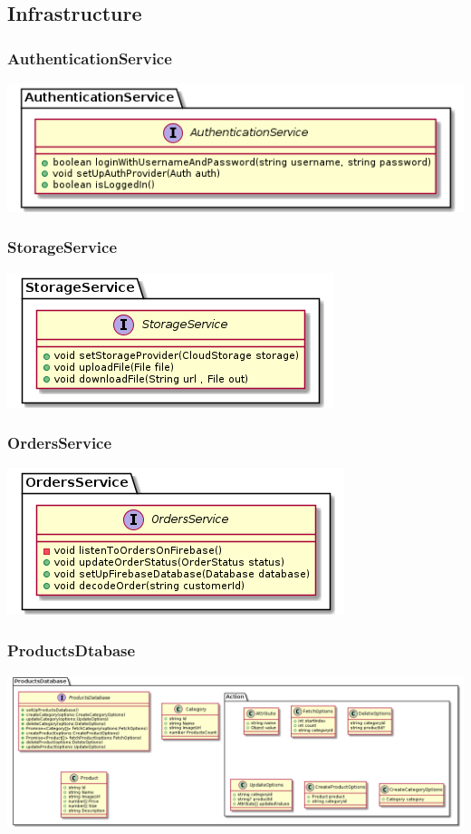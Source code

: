 \documentclass{article}
\begin{document}
\subsection{Infrastructure}
\subsubsection{AuthenticationService}
\includegraphics[scale=0.75]{./out/NodeApp/AuthenticationService/AuthService.png}

\subsubsection{StorageService}
\includegraphics[scale=0.75]{./out/NodeApp/StorageService/StorageService.png}

\subsubsection{OrdersService}
\includegraphics[scale=1]{./out/NodeApp/OrdersService/OrdersService.png}

\subsubsection{ProductsDtabase}
\includegraphics[scale=0.38]{./out/NodeApp/Database/ProductsDatabase.png}
\end{document}
